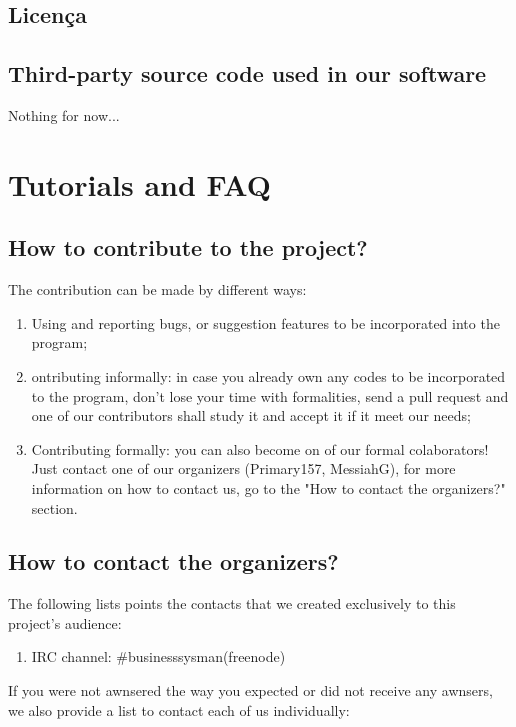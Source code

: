 \documentclass[a4paper,12pt]{article}
\begin{document}
		\subsection{Licença} 
		
		\subsection{Third-party source code used in our software}
		
		Nothing for now...
		
	\section{Tutorials and FAQ}
		\subsection{How to contribute to the project?}
		The contribution can be made by different ways:
		\begin{enumerate}
			\item Using and reporting bugs, or suggestion features to be incorporated into the program;
			\item ontributing informally: in case you already own any codes to be incorporated to the program, don't lose your time with formalities, send a pull request and one of our contributors shall study it and accept it if it meet our needs;
			\item Contributing formally: you can also become on of our formal colaborators! Just contact one of our organizers (Primary157, MessiahG), for more information on how to contact us, go to the "How to contact the organizers?" section.
		\end{enumerate}
		\subsection{How to contact the organizers?}
		The following lists points the contacts that we created exclusively to this project's audience:
		 \begin{enumerate}
		 	\item IRC channel: \#businesssysman(freenode)
		 \end{enumerate}
		If you were not awnsered the way you expected or did not receive any awnsers, we also provide a list to contact each of us individually:
\end{document}
